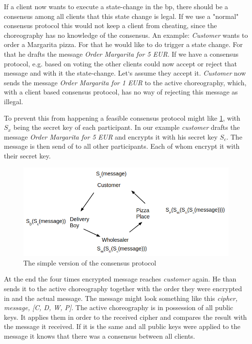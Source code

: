 \documentclass[runningheads]{llncs}
\begin{document}
If a client now wants to execute a state-change in the bp, there should be a consensus among all clients that this state change is legal. If we use a "normal" consensus protocol this would not keep a client from cheating, since the choreography has no knowledge of the consensus. An example: \textit{Customer} wants to order a Margarita pizza. For that he would like to do trigger a state change. For that he drafts the message \textit{Order Margarita for 5 EUR}. If we have a consensus protocol, e.g. based on voting the other clients could now accept or reject that message and with it the state-change. Let`s assume they accept it. \textit{Customer} now sends the message \textit{Order Margarita for 1 EUR} to the active choreography, which, with a client based consensus protocol, has no way of rejecting this message as illegal. 

To prevent this from happening a feasible consensus protocol might like \ref{fig:simple}, with $S_x$ being the secret key of each participant. In our example \textit{customer} drafts the message \textit{Order Margarita for 5 EUR} and encrypts it with his secret key $S_c$. The message is then send of to all other participants. Each of whom encrypt it with their secret key. 


\begin{figure}
    \centering
    \includegraphics[scale=0.6]{simple_consensus.png}
    \caption{The simple version of the consensus protocol}
    \label{fig:simple}
\end{figure}


At the end the four times encrypted message reaches \textit{customer} again. He than sends it to the active choreography together with the order they were encrypted in and the actual message. The message might look something like this \textit{cipher, message, [C, D, W, P]}. The active choreography is in possession of all public keys. It applies them in order to the received cipher and compares the result with the message it received. If it is the same and all public keys were applied to the message it knows that there was a consensus between all clients. 
\end{document}
